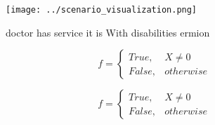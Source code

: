 \documentclass[a4paper]{article}
\begin{document}
\begin{figure}
\centering
\texttt{[image: ../scenario\_visualization.png]}
\caption{doctor has service it is With disabilities ermion
}
\end{figure}
 
\begin{equation}   f =
\begin{cases} True, & X \neq 0\\
False, & otherwise
\end{cases}
\end{equation}

\begin{equation}   f =
\begin{cases} True, & X \neq 0\\
False, & otherwise
\end{cases}
\end{equation}
\end{document}
